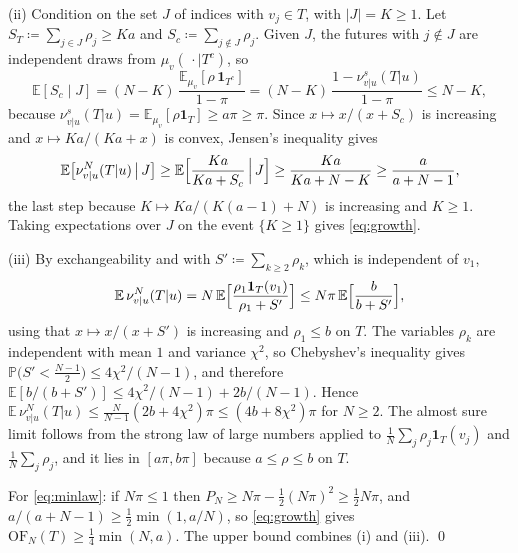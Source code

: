 \documentclass[11pt]{article}
\theoremstyle{plain}
\theoremstyle{definition}
\theoremstyle{remark}
\newcommand{\E}{\mathbb{E}}
\newcommand{\define}{\coloneqq}
\newcommand{\abs}[1]{\left\lvert #1 \right\rvert}
\newcommand{\indicator}{\mathbf{1}}
\begin{document}
(ii) Condition on the set $J$ of indices with $v_j\in T$, with $\abs{J}=K\ge1$.
Let $S_T\define\sum_{j\in J}\rho_j\ge Ka$ and
$S_c\define\sum_{j\notin J}\rho_j$. Given $J$, the futures with $j\notin J$
are independent draws from $\mu_v(\,\cdot\mid T^{c})$, so
\begin{equation*}
 \E[S_c\mid J]=(N-K)\,\frac{\E_{\mu_v}[\rho\,\indicator_{T^{c}}]}{1-\pi}
 =(N-K)\,\frac{1-\nu^{s}_{v\vert u}(T\vert u)}{1-\pi}\le N-K,
\end{equation*}
because $\nu^{s}_{v\vert u}(T\vert u)=\E_{\mu_v}[\rho\indicator_T]\ge a\pi\ge\pi$.
Since $x\mapsto x/(x+S_c)$ is increasing and $x\mapsto Ka/(Ka+x)$ is convex,
Jensen's inequality gives
\begin{equation}
 \E\bigl[\nu^{N}_{v\vert u}(T\vert u)\,\big\vert\,J\bigr]
 \ge\E\Bigl[\frac{Ka}{Ka+S_c}\,\Big\vert\,J\Bigr]
 \ge\frac{Ka}{Ka+N-K}\ge\frac{a}{a+N-1},
 \label{eq:condweight}
\end{equation}
the last step because $K\mapsto Ka/(K(a-1)+N)$ is increasing and $K\ge1$.
Taking expectations over $J$ on the event $\{K\ge1\}$ gives \eqref{eq:growth}.

(iii) By exchangeability and with $S'\define\sum_{k\ge2}\rho_k$, which is
independent of $v_1$,
\begin{equation*}
 \E\,\nu^{N}_{v\vert u}(T\vert u)=N\,\E\Bigl[\frac{\rho_1\indicator_T(v_1)}{\rho_1+S'}\Bigr]
 \le N\pi\,\E\Bigl[\frac{b}{b+S'}\Bigr],
\end{equation*}
using that $x\mapsto x/(x+S')$ is increasing and $\rho_1\le b$ on $T$. The
variables $\rho_k$ are independent with mean $1$ and variance $\chi^{2}$, so
Chebyshev's inequality gives
$\mathbb{P}\bigl(S'<\tfrac{N-1}{2}\bigr)\le4\chi^{2}/(N-1)$, and therefore
$\E[b/(b+S')]\le4\chi^{2}/(N-1)+2b/(N-1)$. Hence
$\E\,\nu^{N}_{v\vert u}(T\vert u)\le\frac{N}{N-1}(2b+4\chi^{2})\pi\le(4b+8\chi^{2})\pi$
for $N\ge2$. The almost sure limit follows from the strong law of large
numbers applied to $\frac1N\sum_j\rho_j\indicator_T(v_j)$ and
$\frac1N\sum_j\rho_j$, and it lies in $[a\pi,b\pi]$ because $a\le\rho\le b$ on
$T$.

For \eqref{eq:minlaw}: if $N\pi\le1$ then $P_N\ge N\pi-\tfrac12(N\pi)^{2}\ge\tfrac12N\pi$,
and $a/(a+N-1)\ge\tfrac12\min(1,a/N)$, so \eqref{eq:growth} gives
$\mathrm{OF}_N(T)\ge\tfrac14\min(N,a)$. The upper bound combines (i) and
(iii).
\qed
\end{document}
